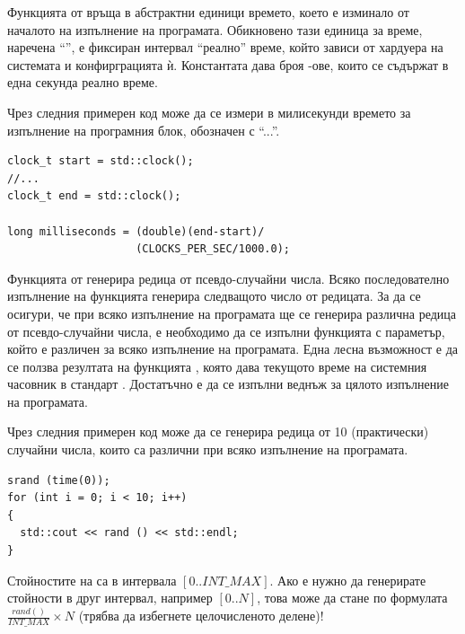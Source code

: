 {\begin{enumerate}[resume]
\end{enumerate}

\begin{mdframed}[hidealllines=true,backgroundcolor=gray!20]
Функцията  от  връща в абстрактни единици времето, което е изминало от началото на изпълнение на програмата. Обикновено тази единица за време, наречена ``'', е фиксиран интервал ``реално'' време, който зависи от хардуера на системата и конфирграцията ѝ. Константата  дава броя -ове, които се съдържат в една секунда реално време.

Чрез следния примерен код може да се измери в милисекунди времето за изпълнение на програмния блок, обозначен с ``...''.
\begin{verbatim}
clock_t start = std::clock();
//...
clock_t end = std::clock();

long milliseconds = (double)(end-start)/
                    (CLOCKS_PER_SEC/1000.0);

\end{verbatim}
\end{mdframed}
\begin{mdframed}[hidealllines=true,backgroundcolor=gray!20]
Функцията  от  генерира редица от псевдо-случайни числа. Всяко последователно изпълнение на функцията генерира следващото число от редицата. За да се осигури, че при всяко изпълнение на програмата ще се генерира различна редица от псевдо-случайни числа, е необходимо да се изпълни функцията  с параметър, който е различен за всяко изпълнение на програмата. Една лесна възможност е да се ползва резултата на функцията , която дава текущото време на системния часовник в стандарт . Достатъчно е  да се изпълни веднъж за цялото изпълнение на програмата.

Чрез следния примерен код може да се генерира редица от 10 (практически) случайни числа, които са различни при всяко изпълнение на програмата.
\begin{verbatim}
srand (time(0));
for (int i = 0; i < 10; i++)
{
  std::cout << rand () << std::endl;
}
\end{verbatim}
Стойностите на  са в интервала $[0..INT\_MAX]$. Ако е нужно да генерирате стойности в друг интервал, например $[0..N]$, това може да стане по формулата $\frac{rand()}{INT\_MAX}\times N$ (трябва да избегнете целочисленото делене)!
\end{mdframed}

}
